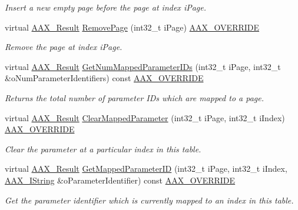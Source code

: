 \begin{DoxyCompactItemize}
\begin{DoxyCompactList}\small\item\em Insert a new empty page before the page at index {\ttfamily i\+Page}. \end{DoxyCompactList}\item 
virtual \hyperlink{a00149_a4d8f69a697df7f70c3a8e9b8ee130d2f}{A\+A\+X\+\_\+\+Result} \hyperlink{a00138_adc37a50e0589674608e6c52898722192}{Remove\+Page} (int32\+\_\+t i\+Page) \hyperlink{a00149_ac2f24a5172689ae684344abdcce55463}{A\+A\+X\+\_\+\+O\+V\+E\+R\+R\+I\+D\+E}
\begin{DoxyCompactList}\small\item\em Remove the page at index {\ttfamily i\+Page}. \end{DoxyCompactList}\item 
virtual \hyperlink{a00149_a4d8f69a697df7f70c3a8e9b8ee130d2f}{A\+A\+X\+\_\+\+Result} \hyperlink{a00138_ae1ac042a07bb3397934c22c33c59423b}{Get\+Num\+Mapped\+Parameter\+I\+Ds} (int32\+\_\+t i\+Page, int32\+\_\+t \&o\+Num\+Parameter\+Identifiers) const \hyperlink{a00149_ac2f24a5172689ae684344abdcce55463}{A\+A\+X\+\_\+\+O\+V\+E\+R\+R\+I\+D\+E}
\begin{DoxyCompactList}\small\item\em Returns the total number of parameter I\+Ds which are mapped to a page. \end{DoxyCompactList}\item 
virtual \hyperlink{a00149_a4d8f69a697df7f70c3a8e9b8ee130d2f}{A\+A\+X\+\_\+\+Result} \hyperlink{a00138_aeb4c73fe20792885d9b299b44be639dd}{Clear\+Mapped\+Parameter} (int32\+\_\+t i\+Page, int32\+\_\+t i\+Index) \hyperlink{a00149_ac2f24a5172689ae684344abdcce55463}{A\+A\+X\+\_\+\+O\+V\+E\+R\+R\+I\+D\+E}
\begin{DoxyCompactList}\small\item\em Clear the parameter at a particular index in this table. \end{DoxyCompactList}\item 
virtual \hyperlink{a00149_a4d8f69a697df7f70c3a8e9b8ee130d2f}{A\+A\+X\+\_\+\+Result} \hyperlink{a00138_a4158d71f6c3ddc1d0ad4d2920180ef37}{Get\+Mapped\+Parameter\+I\+D} (int32\+\_\+t i\+Page, int32\+\_\+t i\+Index, \hyperlink{a00113}{A\+A\+X\+\_\+\+I\+String} \&o\+Parameter\+Identifier) const \hyperlink{a00149_ac2f24a5172689ae684344abdcce55463}{A\+A\+X\+\_\+\+O\+V\+E\+R\+R\+I\+D\+E}
\begin{DoxyCompactList}\small\item\em Get the parameter identifier which is currently mapped to an index in this table. \end{DoxyCompactList}\item 

\end{DoxyCompactItemize}

